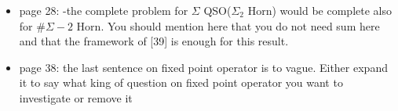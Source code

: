 \documentclass[a4paper]{article}
\begin{document}
\begin{itemize}
	\item page 28:	-the complete problem for $\Sigma$ QSO($\Sigma_2$ Horn) would be complete also for $\#\Sigma-2$ Horn. You should mention here that you do not need sum here	and that the framework of [39] is enough for this result.
	\item page 38: the last sentence on fixed point operator is to vague. Either expand it to say what king of question on fixed point operator you want to investigate or remove it	
\end{itemize}




	
\end{document}
